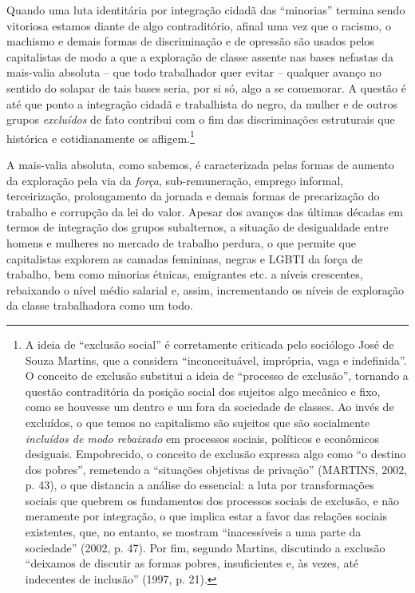 Quando uma luta identitária por integração cidadã das ``minorias''
termina sendo vitoriosa estamos diante de algo contraditório, afinal uma
vez que o racismo, o machismo e demais formas de discriminação e de
opressão são usados pelos capitalistas de modo a que a exploração de
classe assente nas bases nefastas da mais-valia absoluta -- que todo
trabalhador quer evitar -- qualquer avanço no sentido do solapar de tais
bases seria, por si só, algo a se comemorar. A questão é até que ponto a
integração cidadã e trabalhista do negro, da mulher e de outros grupos
\emph{excluídos} de fato contribui com o fim das discriminações
estruturais que histórica e cotidianamente os afligem.\footnote{A ideia
  de ``exclusão social'' é corretamente criticada pelo sociólogo José de
  Souza Martins, que a considera ``inconceituável, imprópria, vaga e
  indefinida''. O conceito de exclusão substitui a ideia de ``processo
  de exclusão'', tornando a questão contraditória da posição social dos
  sujeitos algo mecânico e fixo, como se houvesse um dentro e um fora da
  sociedade de classes. Ao invés de excluídos, o que temos no
  capitalismo são sujeitos que são socialmente \emph{incluídos de modo
  rebaixado} em processos sociais, políticos e econômicos desiguais.
  Empobrecido, o conceito de exclusão expressa algo como ``o destino dos
  pobres'', remetendo a ``situações objetivas de privação'' (MARTINS,
  2002, p. 43), o que distancia a análise do essencial: a luta por
  transformações sociais que quebrem os fundamentos dos processos
  sociais de exclusão, e não meramente por integração, o que implica
  estar a favor das relações sociais existentes, que, no entanto, se
  mostram ``inacessíveis a uma parte da sociedade'' (2002, p. 47). Por
  fim, segundo Martins, discutindo a exclusão ``deixamos de discutir as
  formas pobres, insuficientes e, às vezes, até indecentes de inclusão''
  (1997, p. 21).}

A mais-valia absoluta, como sabemos, é caracterizada pelas formas de
aumento da exploração pela via da \emph{força}, sub-remuneração, emprego
informal, terceirização, prolongamento da jornada e demais formas de
precarização do trabalho e corrupção da lei do valor. Apesar dos avanços
das últimas décadas em termos de integração dos grupos subalternos, a
situação de desigualdade entre homens e mulheres no mercado de trabalho
perdura, o que permite que capitalistas explorem as camadas femininas,
negras e LGBTI da força de trabalho, bem como minorias étnicas,
emigrantes etc. a níveis crescentes, rebaixando o nível médio salarial
e, assim, incrementando os níveis de exploração da classe trabalhadora
como um todo.

